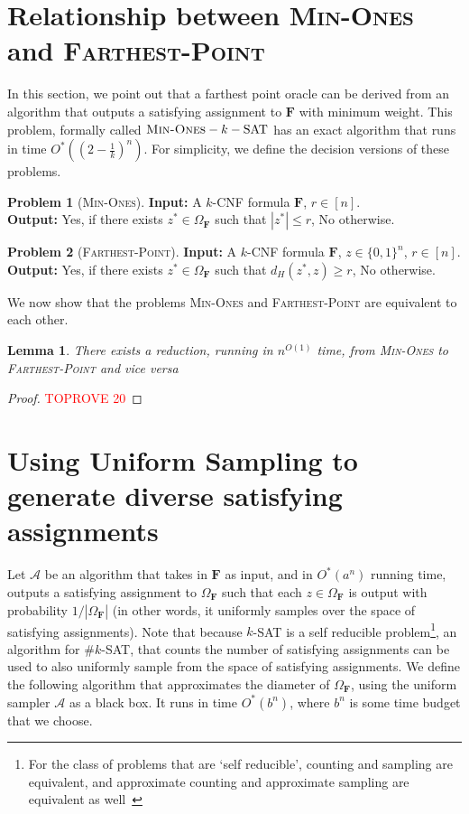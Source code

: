 \documentclass[11pt, letterpaper]{article}
\newtheorem{lemma}[theorem]{Lemma}
\theoremstyle{definition}
\newtheorem{problem}{Problem}
\newcommand{\alg}{\mathcal{A}}
\newcommand{\Q}[1]{\{0,1\}^{#1}}
\newcommand{\f}{\mathbf{F}}
\newcommand{\Om}{\Omega_{\f}}
\begin{document}
 \section{Relationship between \textsc{Min-Ones} and \textsc{Farthest-Point}}
\label{app:minones}
In this section, we point out that a farthest point oracle can be derived from an algorithm that outputs a satisfying assignment to $\f$ with minimum weight. This problem, formally called $\textsc{Min-Ones}-k-\text{SAT}$ has an exact algorithm that runs in time $O^*\left( \left(2-\frac{1}{k}\right)^n\right)$. For simplicity, we define the decision versions of these problems. 
\begin{problem}[\textsc{Min-Ones}]
    \textbf{Input: }A $k$-CNF formula $\f$, $r \in [n]$. \\
\textbf{Output: }Yes, if there exists $z^* \in \Om$ such that $|z^*| \leq r$, No otherwise.
\end{problem}
\begin{problem}[\textsc{Farthest-Point}]
    \textbf{Input: }A $k$-CNF formula $\f$, $z \in \Q{n}$, $r \in [n]$. \\
\textbf{Output: }Yes, if there exists $z^* \in \Om$ such that $d_H(z^*, z) \geq r$, No otherwise.
\end{problem}

 We now show that the problems \textsc{Min-Ones} and \textsc{Farthest-Point} are equivalent to each other. 
 \begin{lemma}
     There exists a reduction, running in $n^{O(1)}$ time, from \textsc{Min-Ones} to \textsc{Farthest-Point} and vice versa
 \end{lemma}
 \begin{proof}\textcolor{red}{TOPROVE 20}\end{proof} \section{Using Uniform Sampling to generate diverse satisfying assignments}\label{app:uniformv2}


Let $\alg$ be an algorithm that takes in $\f$ as input, and in $O^*(a^n)$ running time, outputs a satisfying assignment to $\Om$ such that each $z \in \Om$ is output with probability $1/|\Om|$ (in other words, it uniformly samples over the space of satisfying assignments). Note that because $k$-SAT is a self reducible problem\footnote{For the class of problems that are `self reducible', counting and sampling are equivalent, and approximate counting and approximate sampling are equivalent as well~\cite{sinclair1989approximate}}, an algorithm for $\# k$-SAT, that counts the number of satisfying assignments can be used to also uniformly sample from the space of satisfying assignments. We define the following algorithm that approximates the diameter of $\Om$, using the uniform sampler $\alg$ as a black box. It runs in time $O^*(b^n)$, where $b^n $ is some time budget that we choose.
\end{document}
